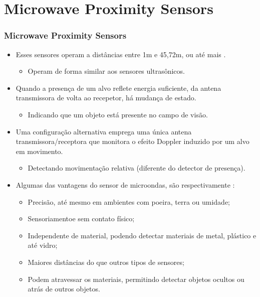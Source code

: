 \documentclass[xcolor=dvipsnames, aspectratio=169]{beamer}
\begin{document}
\section[Microwave Proximity Sensors]{Microwave Proximity Sensors} 
\begin{frame}
\frametitle{Microwave Proximity Sensors}
	\begin{itemize}
		\item Esses sensores operam a distâncias entre 1m e 45,72m, ou até mais \cite{everett1995sensors}.
		\begin{itemize}
			\item Operam de forma similar aos sensores ultrasônicos.
		\end{itemize}
		\item Quando a presença de um alvo reflete energia suficiente, da antena transmissora de volta ao recepetor, há mudança de estado.
		\begin{itemize}
			\item Indicando que um objeto está presente no campo de visão.
		\end{itemize} 
		\item Uma configuração alternativa emprega uma única antena transmissora/receptora que monitora o efeito Doppler induzido por um alvo em movimento.
		\begin{itemize}
			\item Detectando movimentação relativa (diferente do detector de presença).
		\end{itemize}
		\item Algumas das vantagens do sensor de microondas, são respectivamente \cite{electricitymagnetism2023microwave}:
		\begin{itemize}
			\item Precisão, até mesmo em ambientes com poeira, terra ou umidade;
			\item Sensoriamentoe sem contato físico;
			\item Independente de material, podendo detectar materiais de metal, plástico e até vidro;
			\item Maiores distâncias do que outros tipos de sensores;
			\item Podem atravessar os materiais, permitindo detectar objetos ocultos ou atrás de outros objetos.
		\end{itemize}
		

\end{itemize}
\end{frame}
\end{document}
